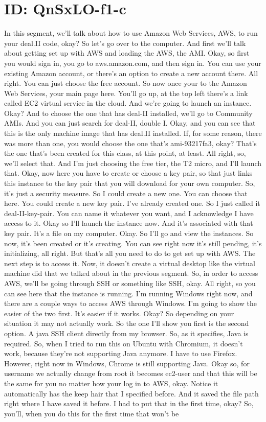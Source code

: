 \documentclass[10pt]{article}
\begin{document}
\section*{ID: QnSxLO-f1-c}
In this segment, we'll talk about how to use Amazon Web Services, AWS, to run your deal.II code, okay? So let's go over to the computer. And first we'll talk about getting set up with AWS and loading the AWS, the AMI. Okay, so first you would sign in, you go to aws.amazon.com, and then sign in. You can use your existing Amazon account, or there's an option to create a new account there. All right. You can just choose the free account. So now once your to the Amazon Web Services, your main page here. You'll go up, at the top left there's a link called EC2 virtual service in the cloud. And we're going to launch an instance. Okay? And to choose the one that has deal-II installed, we'll go to Community AMIs. And you can just search for deal-II, double I. Okay, and you can see that this is the only machine image that has deal.II installed. If, for some reason, there was more than one, you would choose the one that's ami-93217fa3, okay? That's the one that's been created for this class, at this point, at least. All right, so, we'll select that. And I'm just choosing the free tier, the T2 micro, and I'll launch that. Okay, now here you have to create or choose a key pair, so that just links this instance to the key pair that you will download for your own computer. So, it's just a security measure. So I could create a new one. You can choose that here. You could create a new key pair. I've already created one. So I just called it deal-II-key-pair. You can name it whatever you want, and I acknowledge I have access to it. Okay so I'll launch the instance now. And it's associated with that key pair. It's a file on my computer. Okay. So I'll go and view the instances. So now, it's been created or it's creating. You can see right now it's still pending, it's initializing, all right. But that's all you need to do to get set up with AWS. The next step is to access it. Now, it doesn't create a virtual desktop like the virtual machine did that we talked about in the previous segment. So, in order to access AWS, we'll be going through SSH or something like SSH, okay. All right, so you can see here that the instance is running. I'm running Windows right now, and there are a couple ways to access AWS through Windows. I'm going to show the easier of the two first. It's easier if it works. Okay?  So depending on your situation it may not actually work. So the one I'll show you first is the second option. A java SSH client directly from my browser. So, as it specifies, Java is required. So, when I tried to run this on Ubuntu with Chromium, it doesn't work, because they're not supporting Java anymore. I have to use Firefox. However, right now in Windows, Chrome is still supporting Java. Okay so, for username we actually change from root it becomes ec2-user and that this will be the same for you no matter how your log in to AWS, okay. Notice it automatically has the keep hair that I specified before. And it saved the file path right where I have saved it before. I had to put that in the first time, okay? So, you'll, when you do this for the first time that won't be 
\end{document}
